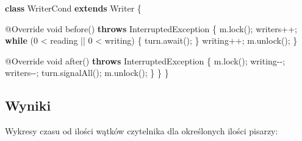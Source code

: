 \documentclass[
]{article}
\newenvironment{Shaded}{\begin{snugshade}}{\end{snugshade}}
\newcommand{\AttributeTok}[1]{\textcolor[rgb]{0.77,0.63,0.00}{#1}}
\newcommand{\BuiltInTok}[1]{#1}
\newcommand{\DataTypeTok}[1]{\textcolor[rgb]{0.13,0.29,0.53}{#1}}
\newcommand{\DecValTok}[1]{\textcolor[rgb]{0.00,0.00,0.81}{#1}}
\newcommand{\FunctionTok}[1]{\textcolor[rgb]{0.00,0.00,0.00}{#1}}
\newcommand{\KeywordTok}[1]{\textcolor[rgb]{0.13,0.29,0.53}{\textbf{#1}}}
\newcommand{\NormalTok}[1]{#1}
\begin{document}
\begin{Shaded}
\begin{Highlighting}[]
    \KeywordTok{class}\NormalTok{ WriterCond }\KeywordTok{extends} \BuiltInTok{Writer}\NormalTok{ \{}

        \AttributeTok{@Override}
        \DataTypeTok{void} \FunctionTok{before}\NormalTok{() }\KeywordTok{throws} \BuiltInTok{InterruptedException}\NormalTok{ \{}
\NormalTok{            m.}\FunctionTok{lock}\NormalTok{();}
\NormalTok{            writers++;}
            \KeywordTok{while}\NormalTok{ (}\DecValTok{0}\NormalTok{ \textless{} reading || }\DecValTok{0}\NormalTok{ \textless{} writing) \{}
\NormalTok{                turn.}\FunctionTok{await}\NormalTok{();}
\NormalTok{            \}}
\NormalTok{            writing++;}
\NormalTok{            m.}\FunctionTok{unlock}\NormalTok{();}
\NormalTok{        \}}

        \AttributeTok{@Override}
        \DataTypeTok{void} \FunctionTok{after}\NormalTok{() }\KeywordTok{throws} \BuiltInTok{InterruptedException}\NormalTok{ \{}
\NormalTok{            m.}\FunctionTok{lock}\NormalTok{();}
\NormalTok{            writing{-}{-};}
\NormalTok{            writers{-}{-};}
\NormalTok{            turn.}\FunctionTok{signalAll}\NormalTok{();}
\NormalTok{            m.}\FunctionTok{unlock}\NormalTok{();}
\NormalTok{        \}}
\NormalTok{    \}}
\NormalTok{\}}
\end{Highlighting}
\end{Shaded}

\hypertarget{wyniki}{%
\subsection{Wyniki}\label{wyniki}}

Wykresy czasu od ilości wątków czytelnika dla określonych ilości
pisarzy:
\end{document}
